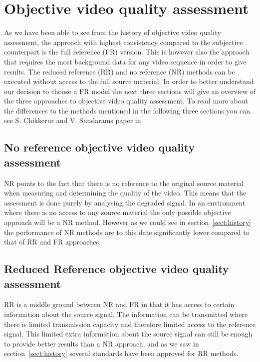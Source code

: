 \section{Objective video quality assessment}\label{sect:ovqa}
As we have been able to see from the history of objective video quality assessment, the approach with highest consistency compared to the subjective counterpart is the full reference (FR) version. This is however also the approach that requires the most background data for any video sequence in order to give results. The reduced reference (RR) and no reference (NR) methods can be executed without access to the full source material. In order to better understand our decision to choose a FR model the next three sections will give an overview of the three approaches to objective video quality assessment. To read more about the differences to the methods mentioned in the following three sections you can see S. Chikkerur and V. Sundarams paper in\cite{5710601}.

\subsection{No reference objective video quality assessment}\label{sect:nr}
NR points to the fact that there is no reference to the original source material when measuring and determining the quality of the video. This means that the assessment is done purely by analysing the degraded signal. In an environment where there is no access to any source material the only possible objective approach will be a NR method. However as we could see in section~\ref{sect:history} the performance of NR methods are to this date significantly lower compared to that of RR and FR approaches.


\subsection{Reduced Reference objective video quality assessment}\label{sect:rr}
RR is a middle ground between NR and FR in that it has access to certain information about the source signal. The information can be transmitted where there is limited transmission capacity and therefore limited access to the reference signal. This limited extra information about the source signal can still be enough to provide better results than a NR approach, and as we saw in section~\ref{sect:history} several standards have been approved for RR methods. 

